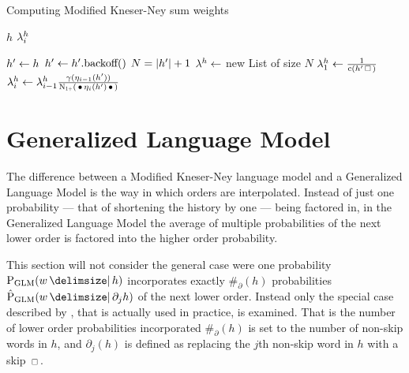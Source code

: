 \begin{algorithm}
  \caption{Computing Modified Kneser-Ney sum weights}
  \label{alg:weightedsum-mkn}
  \begin{algorithmic}[1]
    \Require $h$
    \Ensure $\lambda_i^h$

    \State $h^\prime \gets h$
      \State $h^\prime \gets h^\prime\text{.backoff()}$
    \EndWhile
    \State $N = {\left|h^\prime\right|} + 1$
    \State $\lambda^h \gets$ new List of size $N$
    \State $\SumWeight_1^h \gets \frac{1}{\Count(\SeenHistory \Skp)}$
      \State $\SumWeight_i^h \gets \SumWeight_{i-1}^h \frac{\gamma(\History_{i-1}(\SeenHistory))}{\ContCountIp(\WSkp \History_i(\SeenHistory) \WSkp)}$
    \EndFor
  \end{algorithmic}
\end{algorithm}

\section{Generalized Language Model}

The difference between a Modified Kneser-Ney language model and a
Generalized Language Model is the way in which orders are interpolated.
Instead of just one probability --- that of shortening the history by one ---
being factored in, in the Generalized Language Model the average of multiple
probabilities of the next lower order is factored into the higher order
probability.

This section will not consider the general case were one probability
$\ProbGLM{w}{h}$ incorporates exactly $\#_\partial(h)$ probabilities
$\ProbGLM*{w}{\partial_j h}$ of the next lower order.
Instead only the special case described by \textcite{Pickhardt2014}, that is
actually used in practice, is examined.
That is the number of lower order probabilities incorporated $\#_\partial(h)$
is set to the number of non-skip words in $h$, and $\partial_j(h)$ is defined as
replacing the $j$th non-skip word in $h$ with a skip $\Skp$.

